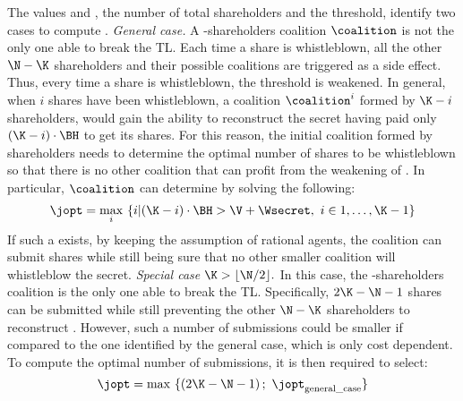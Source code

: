 The values \N and \K, the number of total shareholders and the threshold, identify two cases to compute  \jopt. \newline \vspace*{-0.5em} \newline
{\em General case.}
A \K-shareholders coalition $\coalition$ is not the only one able to break the TL. 
Each time a share is whistleblown, all the other $\N-\K$ shareholders and their possible coalitions are triggered as a side effect.
%
Thus, every time a share is whistleblown, the threshold \K is weakened. 
In general, when $i$ shares have been whistleblown, a coalition $\coalition^i$ formed by $\K-i$ shareholders, would gain the ability to reconstruct the secret \secret having paid only $(\K-i) \cdot \BH$ to get its shares. 
For this reason, the initial coalition \coalition formed by \K shareholders needs to determine the optimal number of shares \jopt to be whistleblown so that there is no other coalition that can profit from the weakening of \K. In particular, $\coalition$ can determine \jopt by solving the following:	
$$\jopt = \operatorname*{max}_i\ \{i | (\K-i) \cdot \BH > \V + \Wsecret,\ i \in 1,\ldots,\K-1 \}$$
If such a \jopt exists, by keeping the assumption of rational agents, the coalition \coalition can submit \jopt shares while still being sure that no other smaller coalition will whistleblow the secret.	\newline \vspace*{-0.5em} \newline
{\em Special case $\K > \lfloor \N/2 \rfloor. $}
In this case, the \K-shareholders coalition \coalition is the only one able to break the TL. 
Specifically, $2\K-\N-1$ shares can be submitted while still preventing the other $\N-\K$ shareholders to reconstruct \secret. 
However, such a number of submissions could be smaller if compared to the one identified by the general case, which is only cost dependent. 
To compute the optimal number of submissions, it is then required to select:
$$ \jopt = \operatorname*{max}\ \{ \left( 2\K - \N - 1 \right) ; \text{ } \jopt _\text{general\textunderscore case} \}$$

